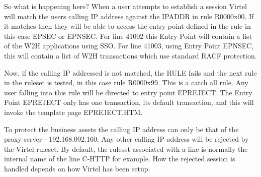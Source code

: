 \documentclass[letterpaper,10pt,english]{sphinxmanual}
\begin{document}
\begin{sphinxVerbatim}[commandchars=\\\{\}]
 
 
                                      
\end{sphinxVerbatim}

So what is happening here? When a user attempts to establish a session Virtel will match the users calling IP address against the IPADDR in rule R0000x00. If it matches then they will be able to access the entry point defined in the rule \textendash{} in this case EPSEC or EPNSEC. For line 41002 this Entry Point will contain a list of the W2H applications using SSO.
For line 41003, using Entry Point EPNSEC, this will contain a list of W2H transactions which use standard RACF protection.

Now, if the calling IP addressed is not matched, the RULE fails and the next rule in the ruleset is tested, in this case rule R0000x99. This is a catch all rule. Any user falling into this rule will be directed to entry point EPREJECT. The Entry Point EPREJECT only has one transaction, its default transaction, and this will invoke the template page
EPREJECT.HTM.

To protect the business assets the calling IP address can only be that of the proxy server - 192.168.092.160. Any other calling IP address will be rejected by the Virtel ruleset. By default, the ruleset associated with a line is normally the internal name of the line \textendash{} C-HTTP for example. How the rejected session is handled depends on how Virtel has been setup.
\end{document}
